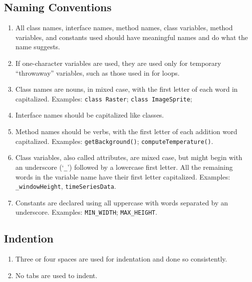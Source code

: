 \subsection*{Naming Conventions}\begin{enumerate}[label=C\arabic*., ref=C\arabic*]
\item \checklistref All class names, interface names, method names, class variables, method variables, and constants used should have meaningful names and do what the name suggests.
\item \checklistref If one-character variables are used, they are used only for temporary ``throwaway'' variables, such as those used in for loops.
\item \checklistref Class names are nouns, in mixed case, with the first letter of each word in capitalized. Examples: \texttt{class Raster}; \texttt{class ImageSprite};
\item \checklistref Interface names should be capitalized like classes.
\item \checklistref Method names should be verbs, with the first letter of each addition word capitalized. Examples: \texttt{getBackground()}; \texttt{computeTemperature()}.
\item \checklistref Class variables, also called attributes, are mixed case, but might begin with an underscore (`\texttt{\_}') followed by a lowercase first letter. All the remaining words in the variable name have their first letter capitalized. Examples: \texttt{\_windowHeight}, \texttt{timeSeriesData}.
\item \checklistref Constants are declared using all uppercase with words separated by an underscore. Examples: \texttt{MIN\_WIDTH}; \texttt{MAX\_HEIGHT}.
\end{enumerate}

\subsection*{Indention}\begin{enumerate}[resume, label=C\arabic*., ref=C\arabic*]
\item \checklistref Three or four spaces are used for indentation and done so consistently.
\item \checklistref No tabs are used to indent.
\end{enumerate}

